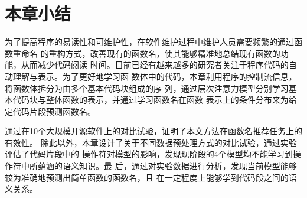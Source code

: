 \section{本章小结}
为了提高程序的易读性和可维护性，在软件维护过程中维护人员需要频繁的通过函数重命名
的重构方式，改善现有的函数名，使其能够精准地总结现有函数的功能，从而减少代码阅读
时间。目前已经有越来越多的研究者关注于程序代码的自动理解与表示。为了更好地学习函
数体中的代码，本章利用程序的控制流信息，将函数体拆分为由多个基本代码块组成的序
列，通过层次注意力模型分别学习基本代码块与整体函数的表示，并通过学习函数名在函数
表示上的条件分布来为给定代码片段预测函数名。

通过在10个大规模开源软件上的对比试验，证明了本文方法在函数名推荐任务上的有效性。
除此以外，本章设计了关于不同数据预处理方式的对比试验，通过实验评估了代码片段中的
操作符对模型的影响，发现现阶段的4个模型均不能学习到操作符中所蕴涵的语义知识。最
后，通过对实验数据进行分析，发现当前模型能够较为准确地预测出简单函数的函数名，且
在一定程度上能够学到代码段之间的语义关系。


